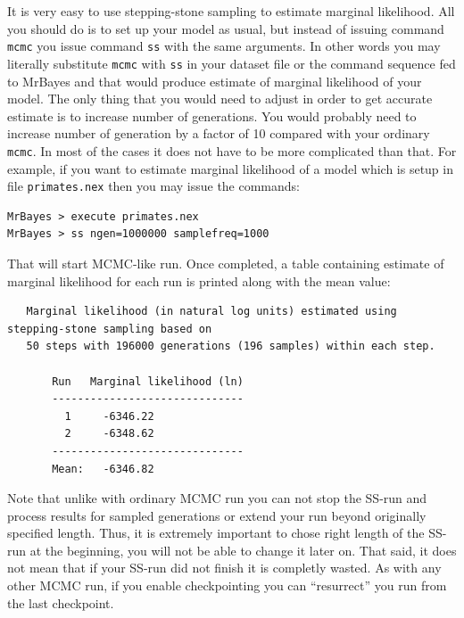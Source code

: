 \documentclass[12pt]{book}
\newcommand{\ttt}[1]{\texttt{#1}}
\begin{document}
It is very easy to use stepping-stone sampling to estimate marginal likelihood. All you should do
is to set up your model as usual, but instead of issuing command \ttt{mcmc} you issue command
\ttt{ss} with the same arguments. In other words you may literally substitute \ttt{mcmc} with
\ttt{ss} in your dataset file or the command sequence fed to MrBayes and that would produce
estimate of marginal likelihood of your model. The only thing that you would need to adjust in
order to get accurate estimate is to increase number of generations. You would probably need to
increase number of generation by a factor of 10 compared with your ordinary \ttt{mcmc}. In most of
the cases it does not have to be more complicated than that. For example, if you want to estimate
marginal likelihood of a model which is setup in file \ttt{primates.nex} then you may issue the
commands:

\small
\begin{singlespacing}
\begin{verbatim}
MrBayes > execute primates.nex
MrBayes > ss ngen=1000000 samplefreq=1000
\end{verbatim}
\end{singlespacing}
\normalsize

That will start MCMC-like run. Once completed, a table containing estimate of marginal likelihood
for each run is printed along with the mean value:

\begin{singlespacing}
\scriptsize
\begin{verbatim}
   Marginal likelihood (in natural log units) estimated using stepping-stone sampling based on
   50 steps with 196000 generations (196 samples) within each step.

       Run   Marginal likelihood (ln)
       ------------------------------
         1     -6346.22
         2     -6348.62
       ------------------------------
       Mean:   -6346.82
\end{verbatim}
\normalsize
\end{singlespacing}

Note that unlike with ordinary MCMC run you can not stop the SS-run and process results for sampled
generations or extend your run beyond originally specified length. Thus, it is extremely important
to chose right length of the SS-run at the beginning, you will not be able to change it later on.
That said, it does not mean that if your SS-run did not finish it is completly wasted. As with any
other MCMC run, if you enable checkpointing you can ``resurrect'' you run from the last checkpoint.
\end{document}
